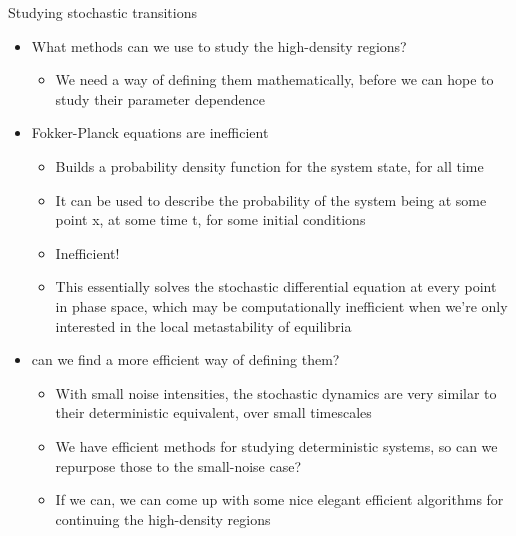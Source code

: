 \documentclass[presentation]{beamer}
\begin{document}
\begin{frame}[label={sec:org33a63cd},plain]{Studying stochastic transitions}
\begin{itemize}
\item What methods can we use to study the high-density regions?
\begin{itemize}
\item We need a way of defining them mathematically, before we can hope to study their parameter dependence
\end{itemize}
\end{itemize}
\vfill
\begin{itemize}
\item Fokker-Planck equations are inefficient
\begin{itemize}
\item Builds a probability density function for the system state, for all time
\item It can be used to describe the probability of the system being at some point x, at some time t, for some initial conditions
\item Inefficient!
\item This essentially solves the stochastic differential equation at every point in phase space, which may be computationally inefficient when we're only interested in the local metastability of equilibria
\end{itemize}
\end{itemize}
\vfill
\begin{itemize}
\item can we find a more efficient way of defining them?
\begin{itemize}
\item With small noise intensities, the stochastic dynamics are very similar to their deterministic equivalent, over small timescales
\item We have efficient methods for studying deterministic systems, so can we repurpose those to the small-noise case?
\item If we can, we can come up with some nice elegant efficient algorithms for continuing the high-density regions
\end{itemize}
\end{itemize}
\end{frame}
\end{document}
